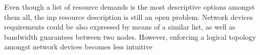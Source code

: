 Even though a list of resource demands is the most descriptive options amongst them all, the \gls{inp} resource description is still an open problem.
Network devices requirements could be also expressed by means of a similar list, as well as bandwidth guarantees between two nodes.
However, enforcing a logical topology amongst network devices becomes less intuitive